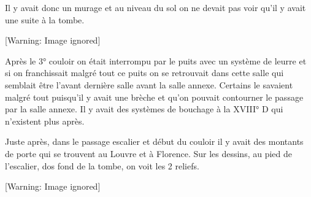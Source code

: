 \documentclass{article}
\begin{document}
Il y avait donc un murage et au niveau du sol on ne devait pas voir
qu’il y avait une suite à la tombe. 

  [Warning: Image ignored] %
 

Après le 3° couloir on était interrompu par le puits avec un système de
leurre et si on franchissait malgré tout ce puits on se retrouvait dans
cette salle qui semblait être l’avant dernière salle avant la salle
annexe. Certains le savaient malgré tout puisqu’il y avait une brèche
et qu’on pouvait contourner le passage par la salle annexe. Il y avait
des systèmes de bouchage à la XVIII° D qui n’existent plus après.

Juste après, dans le passage escalier et début du couloir il y avait des
montants de porte qui se trouvent au Louvre et à Florence. Sur les
dessins, au pied de l’escalier, dos fond de la tombe, on voit les 2
reliefs.

  [Warning: Image ignored] %
 
\end{document}
